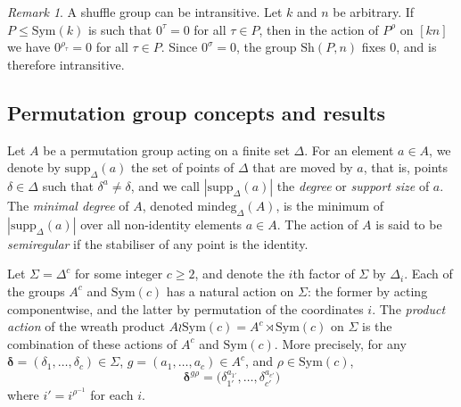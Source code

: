 \documentclass[12pt]{amsart}
\newtheorem{lem}[thm]{Lemma}
\theoremstyle{remark}
\newtheorem{rem}[thm]{Remark}
\theoremstyle{definition}
\newcommand{\sym}{\mathrm{Sym}}
\newcommand{\sh}{\mathrm{Sh}}
\newcommand{\supp}{\mathrm{supp}}
\begin{document}
%
%
%


\begin{rem}
\label{rem:intrans}
A shuffle group can be intransitive. Let $k$ and $n$ be arbitrary. If $P\leqslant \sym(k)$ is such that $0^\tau = 0$ for all $\tau \in P$, then in the action of $P^\rho$ on $[kn]$ we have $0^{\rho_\tau} = 0$ for all $\tau \in P$. Since $0^\sigma = 0$, the group $\sh(P,n)$ fixes $0$, and is therefore intransitive.
\end{rem}

\subsection{Permutation group concepts and results}\label{sub:perm}

Let $A$ be a permutation group acting on a finite set $\Delta$. For an element $a \in A$, we denote by $\supp_\Delta(a)$ the set of points of $\Delta$ that are moved by $a$, that is, points $\delta \in \Delta$ such that $\delta^a \ne \delta$, and we call $|\supp_\Delta(a)|$ the \emph{degree} or \emph{support size} of $a$. The \emph{minimal degree} of $A$, denoted $\textrm{mindeg}_\Delta(A)$, is the minimum of $|\supp_\Delta(a)|$ over all non-identity elements $a \in A$. The action of $A$ is said to be \emph{semiregular} if the stabiliser of any point is the identity.

Let $\Sigma = \Delta^c$ for some integer $c \geqslant 2$, and denote the $i$th factor of $\Sigma$ by $\Delta_i$. Each of the groups $A^c$ and $\sym(c)$ has a natural action on $\Sigma$: the former by acting componentwise, and the latter by permutation of the coordinates $i$. The \emph{product action} of the wreath product $A \wr \sym(c) = A^c \rtimes \sym(c)$ on $\Sigma$ is the combination of these actions of $A^c$ and $\sym(c)$. More precisely, for any ${\boldsymbol\delta} = (\delta_1, \ldots, \delta_c) \in \Sigma$, $g = (a_1, \ldots, a_c) \in A^c$, and $\rho \in \sym(c)$,
	\[ 
	{\boldsymbol\delta}^{g\rho} = \big(\delta^{a_{1'}}_{1'}, \ldots, \delta^{a_{c'}}_{c'}\big) 
	\]
where $i' = i^{\rho^{-1}}$ for each $i$.
\end{document}
